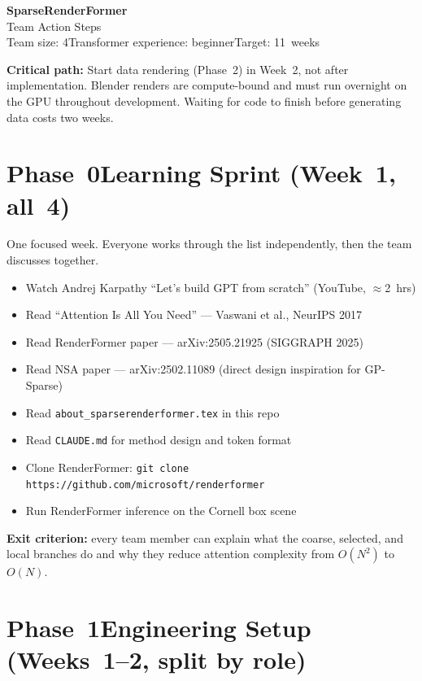 \documentclass[11pt,a4paper]{article}
\newcommand{\critical}[1]{\textcolor{warn}{\textbf{#1}}}
\newcommand{\sq}{\item[$\square$]}
\begin{document}
\begin{center}
  {\LARGE\bfseries SparseRenderFormer}\\[4pt]
  {\large Team Action Steps}\\[6pt]
  {\color{muted} Team size: 4\quad Transformer experience: beginner\quad Target: 11~weeks}
\end{center}

\vspace{6pt}
\noindent\critical{Critical path:} Start data rendering (Phase~2) in Week~2, not after
implementation. Blender renders are compute-bound and must run overnight on the GPU
throughout development. Waiting for code to finish before generating data costs two weeks.

\vspace{6pt}

\section{Phase~0\quad Learning Sprint \textnormal{(Week~1, all~4)}}

One focused week. Everyone works through the list independently, then the team
discusses together.

\begin{itemize}[leftmargin=1.8em, itemsep=2pt]
  \sq Watch Andrej Karpathy ``Let's build GPT from scratch'' (YouTube, $\approx$2~hrs)
  \sq Read ``Attention Is All You Need'' --- Vaswani et al., NeurIPS 2017
  \sq Read RenderFormer paper --- arXiv:2505.21925 (SIGGRAPH 2025)
  \sq Read NSA paper --- arXiv:2502.11089 (direct design inspiration for GP-Sparse)
  \sq Read \texttt{about\_sparserenderformer.tex} in this repo
  \sq Read \texttt{CLAUDE.md} for method design and token format
  \sq Clone RenderFormer: \texttt{git clone https://github.com/microsoft/renderformer}
  \sq Run RenderFormer inference on the Cornell box scene
\end{itemize}

\noindent\textbf{Exit criterion:} every team member can explain what the coarse, selected,
and local branches do and why they reduce attention complexity from $O(N^2)$ to $O(N)$.

\section{Phase~1\quad Engineering Setup \textnormal{(Weeks~1--2, split by role)}}
\end{document}
